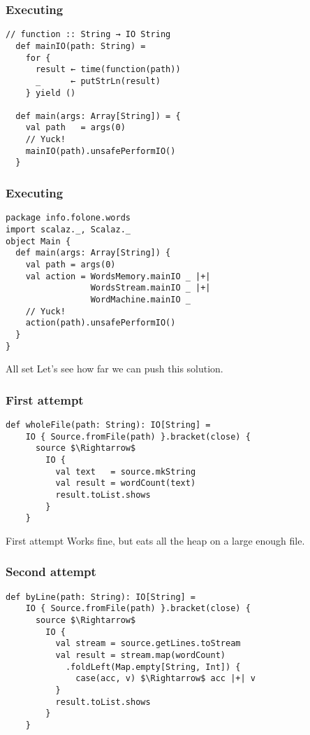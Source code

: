 \documentclass{beamer}
\begin{document}
\begin{frame}[fragile]
\frametitle{Executing}
\begin{lstlisting}[mathescape]
  // function :: String → IO String
  def mainIO(path: String) =
    for {
      result ← time(function(path))
      _      ← putStrLn(result)
    } yield ()

  def main(args: Array[String]) = {
    val path   = args(0)
    // Yuck!
    mainIO(path).unsafePerformIO()
  }
\end{lstlisting}
\end{frame}

\begin{frame}[fragile]
\frametitle{Executing}
\begin{lstlisting}[mathescape]
package info.folone.words
import scalaz._, Scalaz._
object Main {
  def main(args: Array[String]) {
    val path = args(0)
    val action = WordsMemory.mainIO _ |+|
                 WordsStream.mainIO _ |+|
                 WordMachine.mainIO _
    // Yuck!
    action(path).unsafePerformIO()
  }
}
\end{lstlisting}
\end{frame}


\begin{frame}{All set}
  Let's see how far we can push this solution.
\end{frame}

\begin{frame}[fragile]
\frametitle{First attempt}
\begin{lstlisting}[mathescape]
  def wholeFile(path: String): IO[String] =
    IO { Source.fromFile(path) }.bracket(close) {
      source $\Rightarrow$
        IO {
          val text   = source.mkString
          val result = wordCount(text)
          result.toList.shows
        }
    }
\end{lstlisting}
\end{frame}

\begin{frame}{First attempt}
  Works fine, but eats all the heap on a large enough file.
\end{frame}

\begin{frame}[fragile]
\frametitle{Second attempt}
\begin{lstlisting}[mathescape]
  def byLine(path: String): IO[String] =
    IO { Source.fromFile(path) }.bracket(close) {
      source $\Rightarrow$
        IO {
          val stream = source.getLines.toStream
          val result = stream.map(wordCount)
            .foldLeft(Map.empty[String, Int]) {
              case(acc, v) $\Rightarrow$ acc |+| v
          }
          result.toList.shows
        }
    }
\end{lstlisting}
\end{frame}
\end{document}
